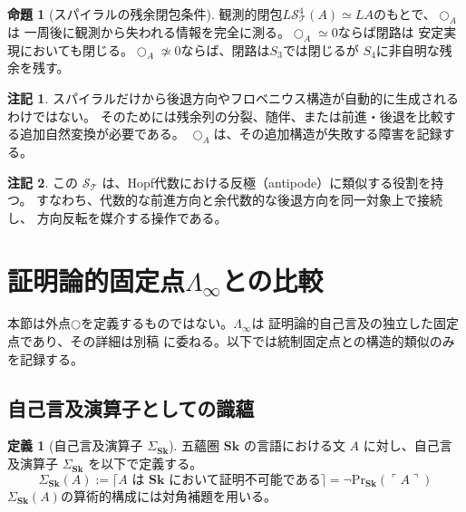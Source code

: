 \documentclass[11pt,a4paper]{ltjsarticle}
\theoremstyle{definition}
\newtheorem{definition}{定義}[section]
\newtheorem{proposition}{命題}[section]
\newtheorem{remark}{注記}[section]
\newcommand{\Sk}{\mathbf{Sk}}
\newcommand{\SpiralT}{\mathcal{S}_{\mathcal{T}}}
\newcommand{\PrSk}{\mathrm{Pr}_{\Sk}}
\newcommand{\LawvereInfinity}{\Lambda_\infty}
\newcommand{\SigmaSk}{\Sigma_{\Sk}}
\begin{document}
\begin{proposition}[スパイラルの残余閉包条件]
観測的閉包$L\SpiralT^4(A)\simeq LA$のもとで、$\bigcirc_A$は
一周後に観測から失われる情報を完全に測る。$\bigcirc_A\simeq0$ならば閉路は
安定実現においても閉じる。$\bigcirc_A\not\simeq0$ならば、閉路は$S_3$では閉じるが
$S_4$に非自明な残余を残す。
\end{proposition}

\begin{remark}
スパイラルだけから後退方向やフロベニウス構造が自動的に生成されるわけではない。
そのためには残余列の分裂、随伴、または前進・後退を比較する追加自然変換が必要である。
$\bigcirc_A$は、その追加構造が失敗する障害を記録する。
\end{remark}

\begin{remark}
この $\SpiralT$ は、Hopf代数における反極（antipode）に類似する役割を持つ。
すなわち、代数的な前進方向と余代数的な後退方向を同一対象上で接続し、
方向反転を媒介する操作である。
\end{remark}

\section{証明論的固定点\texorpdfstring{$\LawvereInfinity$}{Lambda-infinity}との比較}

本節は外点$\bigcirc$を定義するものではない。$\LawvereInfinity$は
証明論的自己言及の独立した固定点であり、その詳細は別稿
\cite{Chiba2026limit}に委ねる。以下では統制固定点との構造的類似のみを記録する。

\subsection{自己言及演算子としての識蘊}

\begin{definition}[自己言及演算子 $\SigmaSk$]\label{def:self-reference-op}
五蘊圏 $\Sk$ の言語における文 $A$ に対し、自己言及演算子 $\SigmaSk$ を以下で定義する。
\begin{equation}
\SigmaSk(A) := \lceil A \text{ は } \Sk \text{ において証明不可能である} \rceil 
= \neg\PrSk(\ulcorner A \urcorner)
\end{equation}
$\SigmaSk(A)$の算術的構成には対角補題を用いる\cite{Chiba2026limit}。
\end{definition}
\end{document}

